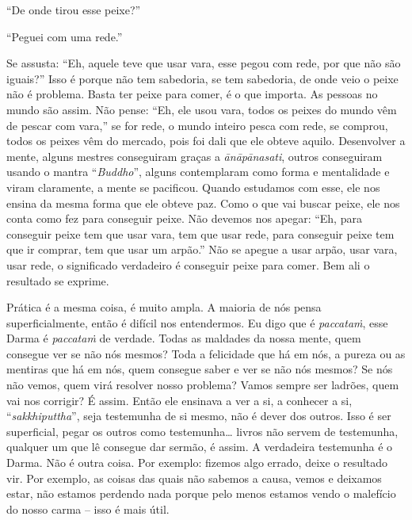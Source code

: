“De onde tirou esse peixe?” 

“Peguei com uma rede.” 

Se assusta: “Eh, aquele teve que usar vara, esse pegou com rede, por
que não são iguais?” Isso é porque não tem sabedoria, se tem sabedoria,
de onde veio o peixe não é problema. Basta ter peixe para comer, é o
que importa. As pessoas no mundo são assim. Não pense: “Eh, ele usou
vara, todos os peixes do mundo vêm de pescar com vara,” se for rede, o
mundo inteiro pesca com rede, se comprou, todos os peixes vêm do
mercado, pois foi dali que ele obteve aquilo. Desenvolver a mente,
alguns mestres conseguiram graças a \textit{ānāpānasati}, outros
conseguiram usando o mantra “\textit{Buddho}”, alguns contemplaram como
forma e mentalidade e viram claramente, a mente se pacificou. Quando
estudamos com esse, ele nos ensina da mesma forma que ele obteve paz.
Como o que vai buscar peixe, ele nos conta como fez para conseguir
peixe. Não devemos nos apegar: “Eh, para conseguir peixe tem que usar
vara, tem que usar rede, para conseguir peixe tem que ir comprar, tem
que usar um arpão.” Não se apegue a usar arpão, usar vara, usar rede, o
significado verdadeiro é conseguir peixe para comer. Bem ali o
resultado se exprime. 

Prática é a mesma coisa, é muito ampla. A maioria de nós pensa
superficialmente, então é difícil nos entendermos. Eu digo que é
\textit{paccataṁ}, esse Darma é \textit{paccataṁ} de verdade. Todas as
maldades da nossa mente, quem consegue ver se não nós mesmos? Toda a
felicidade que há em nós, a pureza ou as mentiras que há em nós, quem
consegue saber e ver se não nós mesmos? Se nós não vemos, quem virá
resolver nosso problema? Vamos sempre ser ladrões, quem vai nos
corrigir? É assim. Então ele ensinava a ver a si, a conhecer a si,
“\textit{sakkhiputtha}”, seja testemunha de si mesmo, não é dever dos
outros. Isso é ser superficial, pegar os outros como testemunha\ldots{} livros
não servem de testemunha, qualquer um que lê consegue dar sermão, é
assim. A verdadeira testemunha é o Darma. Não é outra coisa. Por
exemplo: fizemos algo errado, deixe o resultado vir. Por exemplo, as
coisas das quais não sabemos a causa, vemos e deixamos estar, não
estamos perdendo nada porque pelo menos estamos vendo o malefício do
nosso carma – isso é mais útil. 

